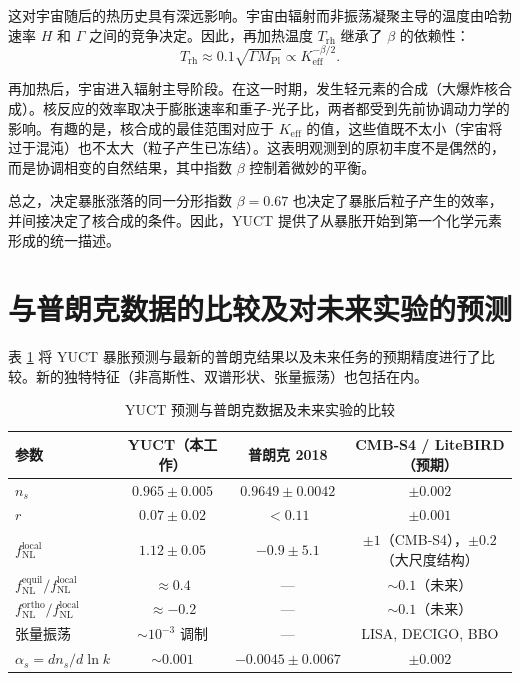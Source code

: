 \documentclass[12pt]{article}
\theoremstyle{remark}
\newcommand{\Keff}{K_{\mathrm{eff}}}
\newcommand{\rs}{r}
\begin{document}
	这对宇宙随后的热历史具有深远影响。宇宙由辐射而非振荡凝聚主导的温度由哈勃速率 $H$ 和 $\Gamma$ 之间的竞争决定。因此，再加热温度 $T_{\mathrm{rh}}$ 继承了 $\beta$ 的依赖性：
	\begin{equation}
		T_{\mathrm{rh}} \approx 0.1 \sqrt{\Gamma M_{\mathrm{Pl}}} \propto \Keff^{-\beta/2}.
		\label{eq:trh}
	\end{equation}
	
	再加热后，宇宙进入辐射主导阶段。在这一时期，发生轻元素的合成（大爆炸核合成）。核反应的效率取决于膨胀速率和重子-光子比，两者都受到先前协调动力学的影响。有趣的是，核合成的最佳范围对应于 $\Keff$ 的值，这些值既不太小（宇宙将过于混沌）也不太大（粒子产生已冻结）。这表明观测到的原初丰度不是偶然的，而是协调相变的自然结果，其中指数 $\beta$ 控制着微妙的平衡。
	
	总之，决定暴胀涨落的同一分形指数 $\beta = 0.67$ 也决定了暴胀后粒子产生的效率，并间接决定了核合成的条件。因此，YUCT 提供了从暴胀开始到第一个化学元素形成的统一描述。
	
	\section{与普朗克数据的比较及对未来实验的预测}
	\label{sec:comparison}
	
	表 \ref{tab:comparison} 将 YUCT 暴胀预测与最新的普朗克结果以及未来任务的预期精度进行了比较。新的独特特征（非高斯性、双谱形状、张量振荡）也包括在内。
	
	\begin{table}[htbp]
		\centering
		\caption{YUCT 预测与普朗克数据及未来实验的比较}
		\label{tab:comparison}
		\begin{tabular}{lccc}
			\toprule
			\textbf{参数} & \textbf{YUCT（本工作）} & \textbf{普朗克 2018} & \textbf{CMB‑S4 / LiteBIRD（预期）} \\
			\midrule
			$n_s$ & $0.965 \pm 0.005$ & $0.9649 \pm 0.0042$ & $\pm 0.002$ \\
			$\rs$ & $0.07 \pm 0.02$ & $<0.11$ & $\pm 0.001$ \\
			$f_{\mathrm{NL}}^{\mathrm{local}}$ & $1.12 \pm 0.05$ & $-0.9 \pm 5.1$ & $\pm 1$（CMB‑S4），$\pm 0.2$（大尺度结构） \\
			$f_{\mathrm{NL}}^{\mathrm{equil}} / f_{\mathrm{NL}}^{\mathrm{local}}$ & $\approx 0.4$ & — & $\sim 0.1$（未来） \\
			$f_{\mathrm{NL}}^{\mathrm{ortho}} / f_{\mathrm{NL}}^{\mathrm{local}}$ & $\approx -0.2$ & — & $\sim 0.1$（未来） \\
			张量振荡 & $\sim 10^{-3}$ 调制 & — & LISA, DECIGO, BBO \\
			$\alpha_s = dn_s/d\ln k$ & $\sim 0.001$ & $-0.0045 \pm 0.0067$ & $\pm 0.002$ \\
			\bottomrule
		\end{tabular}
	\end{table}
	
\end{document}
